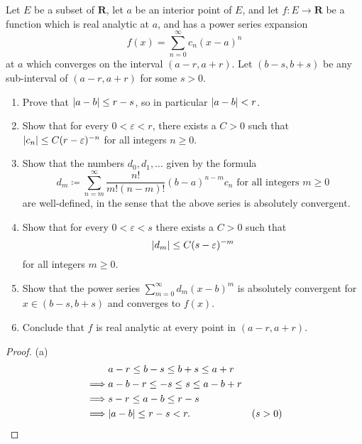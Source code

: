\begin{exercise}\label{ex 4.2.8}
    Let \(E\) be a subset of \(\mathbf{R}\), let \(a\) be an interior point of \(E\), and let \(f : E \to \mathbf{R}\) be a function which is real analytic at \(a\), and has a power series expansion
    \[
        f(x) = \sum_{n = 0}^\infty c_n (x - a)^n
    \]
    at \(a\) which converges on the interval \((a - r, a + r)\).
    Let \((b - s, b + s)\) be any sub-interval of \((a - r, a + r)\) for some \(s > 0\).
    \begin{enumerate}
        \item Prove that \(\abs*{a - b} \leq r - s\), so in particular \(\abs*{a - b} < r\).
        \item Show that for every \(0 < \varepsilon < r\), there exists a \(C > 0\) such that \(\abs*{c_n} \leq C(r - \varepsilon)^{-n}\) for all integers \(n \geq 0\).
        \item Show that the numbers \(d_0, d_1, \dots\) given by the formula
              \[
                  d_m \coloneqq \sum_{n = m}^\infty \frac{n!}{m! (n - m)!} (b - a)^{n - m} c_n \text{ for all integers } m \geq 0
              \]
              are well-defined, in the sense that the above series is absolutely convergent.
        \item Show that for every \(0 < \varepsilon < s\) there exists a \(C > 0\) such that
              \[
                  \abs*{d_m} \leq C(s - \varepsilon)^{-m}
              \]
              for all integers \(m \geq 0\).
        \item Show that the power series \(\sum_{m = 0}^\infty d_m (x - b)^m\) is absolutely convergent for \(x \in (b - s, b + s)\) and converges to \(f(x)\).
        \item Conclude that \(f\) is real analytic at every point in \((a - r, a + r)\).
    \end{enumerate}
\end{exercise}

\begin{proof}{(a)}
    \begin{align*}
                 & a - r \leq b - s \leq b + s \leq a + r            \\
        \implies & a - b - r \leq -s \leq s \leq a - b + r           \\
        \implies & s - r \leq a - b \leq r - s                       \\
        \implies & \abs*{a - b} \leq r - s < r.            & (s > 0)
    \end{align*}
\end{proof}

